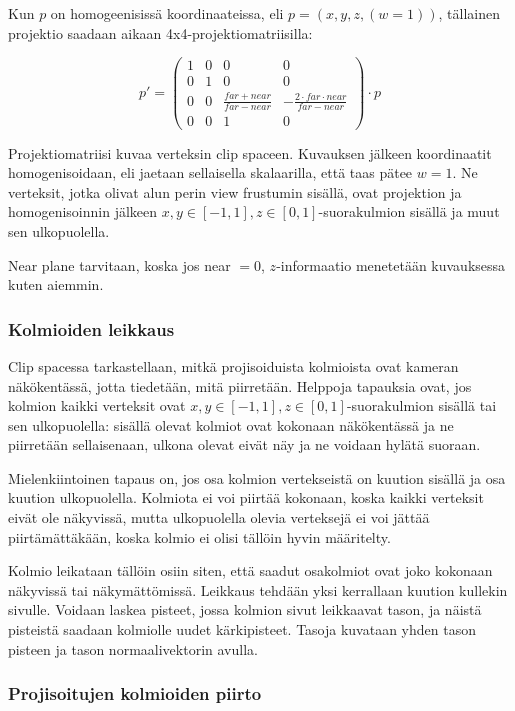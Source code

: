 \documentclass[12pt] {article}
\begin{document}
Kun $p$ on homogeenisissä koordinaateissa, eli $p = (x, y, z, (w = 1))$, tällainen projektio saadaan aikaan 4x4-projektiomatriisilla:

\[
	p' = \begin{pmatrix}
	1 & 0 & 0 & 0 \\
	0 & 1 & 0 & 0 \\
	0 & 0 & \frac{far+near}{far-near} & -\frac{2 \cdot far \cdot near}{far-near} \\
	0 & 0 & 1 & 0
	\end{pmatrix} \cdot p
\]

Projektiomatriisi kuvaa verteksin clip spaceen. Kuvauksen jälkeen koordinaatit homogenisoidaan, eli jaetaan sellaisella skalaarilla, että taas pätee $w = 1$. Ne verteksit, jotka olivat alun perin view frustumin sisällä, ovat projektion ja homogenisoinnin jälkeen $x, y \in [-1, 1], z \in [0, 1]$-suorakulmion sisällä ja muut sen ulkopuolella.

Near plane tarvitaan, koska jos near $= 0$, $z$-informaatio menetetään kuvauksessa kuten aiemmin.

\subsubsection {Kolmioiden leikkaus}

Clip spacessa tarkastellaan, mitkä projisoiduista kolmioista ovat kameran näkökentässä, jotta tiedetään, mitä piirretään. Helppoja tapauksia ovat, jos kolmion kaikki verteksit ovat $x, y \in [-1, 1], z \in [0, 1]$-suorakulmion sisällä tai sen ulkopuolella: sisällä olevat kolmiot ovat kokonaan näkökentässä ja ne piirretään sellaisenaan, ulkona olevat eivät näy ja ne voidaan hylätä suoraan.

Mielenkiintoinen tapaus on, jos osa kolmion vertekseistä on kuution sisällä ja osa kuution ulkopuolella. Kolmiota ei voi piirtää kokonaan, koska kaikki verteksit eivät ole näkyvissä, mutta ulkopuolella olevia verteksejä ei voi jättää piirtämättäkään, koska kolmio ei olisi tällöin hyvin määritelty.

Kolmio leikataan tällöin osiin siten, että saadut osakolmiot ovat joko kokonaan näkyvissä tai näkymättömissä. Leikkaus tehdään yksi kerrallaan kuution kullekin sivulle. Voidaan laskea pisteet, jossa kolmion sivut leikkaavat tason, ja näistä pisteistä saadaan kolmiolle uudet kärkipisteet. Tasoja kuvataan yhden tason pisteen ja tason normaalivektorin avulla.

\subsubsection {Projisoitujen kolmioiden piirto}
\end{document}
